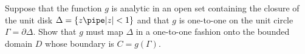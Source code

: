 Suppose that the function $g$ is analytic in an open set containing
the closure of the unit disk $\Delta=\{z\pipe |z|<1\}$ and that $g$
is one-to-one on the unit circle $\Gamma=\partial \Delta$. Show that
$g$ must map $\Delta$ in a one-to-one fashion onto the bounded domain
$D$ whose boundary is $C=g(\Gamma)$.
